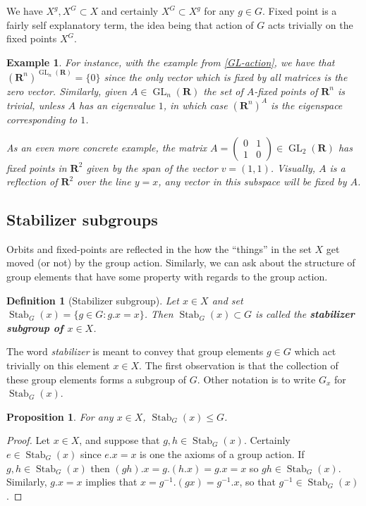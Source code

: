 \documentclass[12pt]{article}
\numberwithin{equation}{subsection}
\newtheorem{prop}[subsection]{Proposition}
\newtheorem{defn}[subsection]{Definition}
\theoremstyle{note}
\newtheorem{example}[subsection]{Example}
\newcommand{\GL}{\operatorname{GL}}
\newcommand{\Stab}{\operatorname{Stab}}
\begin{document}
We have $X^g, X^G\subset X$ and certainly $X^G\subset X^g$ for any $g\in G$. Fixed point is a fairly self explanatory term, the idea being that action of $G$ acts trivially on the fixed points $X^G$. 

\begin{example}For instance, with the example from \ref{GL-action}, we have that $(\mathbf{R}^n)^{\GL_n(\mathbf{R})}=\{0\}$ since the only vector which is fixed by all matrices is the zero vector. Similarly, given $A\in \GL_n(\mathbf{R})$ the set of $A$-fixed points of $\mathbf{R}^n$ is trivial, unless $A$ has an eigenvalue $1$, in which case $(\mathbf{R}^n)^A$ is the eigenspace corresponding to $1$. 

As an even more concrete example, the matrix $A=\begin{pmatrix} 0 & 1 \\ 1 & 0\end{pmatrix}\in\GL_2(\mathbf{R})$ has fixed points in $\mathbf{R}^2$ given by the span of the vector $v=(1,1)$. Visually, $A$ is a reflection of $\mathbf{R}^2$ over the line $y=x$, any vector in this subspace will be fixed by $A$.\end{example}



\subsection{Stabilizer subgroups}
Orbits and fixed-points are reflected in the how the ``things'' in the set $X$ get moved (or not) by the group action. Similarly, we can ask about the structure of group elements that have some property with regards to the group action. 

\begin{defn}[Stabilizer subgroup]
	Let $x\in X$ and set $\Stab_G(x)=\{ g\in G : g.x=x \}$. Then $\Stab_G(x)\subset G$ is called the \textbf{stabilizer subgroup of $x\in X$}.\end{defn}

The word \textit{stabilizer} is meant to convey that group elements $g\in G$ which act trivially on this element $x\in X$. The first observation is that the collection of these group elements forms a subgroup of $G$. Other notation is to write $G_x$ for $\Stab_G(x)$.
	
\begin{prop} 
	For any $x\in X$, $\Stab_G(x)\leq G$. 
\end{prop}

\begin{proof} Let $x\in X$, and suppose that $g,h\in \Stab_G(x)$. Certainly $e\in \Stab_G(x)$ since $e.x=x$ is one the axioms of a group action. If $g,h\in \Stab_G(x)$ then $(gh).x=g.(h.x)=g.x=x$ so $gh\in \Stab_G(x)$. Similarly, $g.x=x$ implies that $x=g^{-1}.(gx)=g^{-1}.x$, so that $g^{-1}\in \Stab_G(x)$. 
\end{proof}
\end{document}
